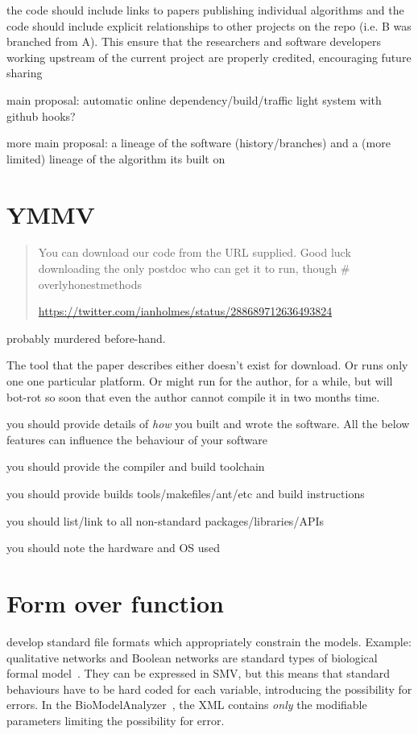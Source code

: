 \documentclass[conference]{IEEEtran}
\begin{document}
the code should include links to papers publishing individual
algorithms and the code should include explicit relationships to other
projects on the repo (i.e. B was branched from A). This ensure that
the researchers and software developers working upstream of the
current project are properly credited, encouraging future sharing

main proposal: automatic online dependency/build/traffic light system
with github hooks?

more main proposal: a lineage of the software (history/branches) and a
(more limited) lineage of the algorithm its built on

\section{YMMV}

\begin{quote}
You can download our code from the URL supplied. Good luck downloading the only postdoc who can get it to run, though \# overlyhonestmethods

\url{https://twitter.com/ianholmes/status/288689712636493824} 
\end{quote}


probably murdered before-hand. 

The tool that the paper describes either doesn't exist for
download. Or runs only one one particular platform. Or might run for
the author, for a while, but will bot-rot so soon that even the author
cannot compile it in two months time.



you should provide details of \emph{how} you built and wrote the software. All the below features can influence the behaviour of your software

you should provide the compiler and build toolchain

you should provide builds tools/makefiles/ant/etc and build instructions

you should list/link to all non-standard packages/libraries/APIs

you should note the hardware and OS used


\section{Form over function}

develop standard file formats which appropriately constrain the
models. Example: qualitative networks and Boolean networks are
standard types of biological formal
model~\cite{Kauffman1969,Schaub2007}. They can be expressed in SMV,
but this means that standard behaviours have to be hard coded for each
variable, introducing the possibility for errors. In the
BioModelAnalyzer~\cite{Benque2012}, the XML contains \emph{only} the
modifiable parameters limiting the possibility for error.
\end{document}
